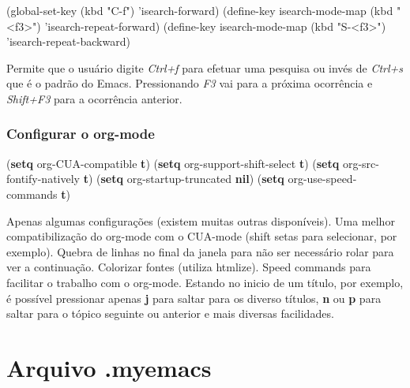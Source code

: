 \documentclass[]{article}
\newenvironment{Shaded}{}{}
\newcommand{\KeywordTok}[1]{\textcolor[rgb]{0.00,0.44,0.13}{\textbf{{#1}}}}
\newcommand{\StringTok}[1]{\textcolor[rgb]{0.25,0.44,0.63}{{#1}}}
\newcommand{\NormalTok}[1]{{#1}}
\begin{document}
\begin{Shaded}
\begin{Highlighting}[]
\NormalTok{(global-set-key (kbd }\StringTok{"C-f"}\NormalTok{) 'isearch-forward)}
\NormalTok{(define-key isearch-mode-map (kbd }\StringTok{"<f3>"}\NormalTok{)}
  \NormalTok{'isearch-repeat-forward)}
\NormalTok{(define-key isearch-mode-map (kbd }\StringTok{"S-<f3>"}\NormalTok{)}
  \NormalTok{'isearch-repeat-backward)}
\end{Highlighting}
\end{Shaded}

Permite que o usuário digite \emph{Ctrl+f} para efetuar uma pesquisa ou
invés de \emph{Ctrl+s} que é o padrão do Emacs. Pressionando \emph{F3}
vai para a próxima ocorrência e \emph{Shift+F3} para a ocorrência
anterior.

\subsubsection{Configurar o org-mode}\label{configurar-o-org-mode}

\begin{Shaded}
\begin{Highlighting}[]
\NormalTok{(}\KeywordTok{setq} \NormalTok{org-CUA-compatible }\KeywordTok{t}\NormalTok{)}
\NormalTok{(}\KeywordTok{setq} \NormalTok{org-support-shift-select }\KeywordTok{t}\NormalTok{)}
\NormalTok{(}\KeywordTok{setq} \NormalTok{org-src-fontify-natively }\KeywordTok{t}\NormalTok{)}
\NormalTok{(}\KeywordTok{setq} \NormalTok{org-startup-truncated }\KeywordTok{nil}\NormalTok{)}
\NormalTok{(}\KeywordTok{setq} \NormalTok{org-use-speed-commands }\KeywordTok{t}\NormalTok{)}
\end{Highlighting}
\end{Shaded}

Apenas algumas configurações (existem muitas outras disponíveis). Uma
melhor compatibilização do org-mode com o CUA-mode (shift setas para
selecionar, por exemplo). Quebra de linhas no final da janela para não
ser necessário rolar para ver a continuação. Colorizar fontes (utiliza
htmlize). Speed commands para facilitar o trabalho com o org-mode.
Estando no inicio de um título, por exemplo, é possível pressionar
apenas \textbf{j} para saltar para os diverso títulos, \textbf{n} ou
\textbf{p} para saltar para o tópico seguinte ou anterior e mais
diversas facilidades.

\section{Arquivo .myemacs}\label{arquivo-.myemacs}
\end{document}
